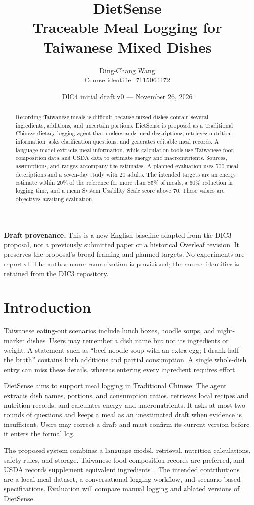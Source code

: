 \documentclass[11pt,a4paper]{article}
\title{DietSense\\Traceable Meal Logging for Taiwanese Mixed Dishes}
\author{Ding-Chang Wang\\Course identifier 7115064172}
\date{DIC4 initial draft v0 --- November 26, 2026}
\begin{document}
\maketitle
\textbf{Draft provenance.} This is a new English baseline adapted from the DIC3 proposal, not a previously submitted paper or a historical Overleaf revision. It preserves the proposal's broad framing and planned targets. No experiments are reported. The author-name romanization is provisional; the course identifier is retained from the DIC3 repository.
\begin{abstract}
Recording Taiwanese meals is difficult because mixed dishes contain several ingredients, additions, and uncertain portions. DietSense is proposed as a Traditional Chinese dietary logging agent that understands meal descriptions, retrieves nutrition information, asks clarification questions, and generates editable meal records. A language model extracts meal information, while calculation tools use Taiwanese food composition data and USDA data to estimate energy and macronutrients. Sources, assumptions, and ranges accompany the estimates. A planned evaluation uses 500 meal descriptions and a seven-day study with 20 adults. The intended targets are an energy estimate within 20\% of the reference for more than 85\% of meals, a 60\% reduction in logging time, and a mean System Usability Scale score above 70. These values are objectives awaiting evaluation.
\end{abstract}
\section{Introduction}
Taiwanese eating-out scenarios include lunch boxes, noodle soups, and night-market dishes. Users may remember a dish name but not its ingredients or weight. A statement such as ``beef noodle soup with an extra egg; I drank half the broth'' contains both additions and partial consumption. A single whole-dish entry can miss these details, whereas entering every ingredient requires effort.

DietSense aims to support meal logging in Traditional Chinese. The agent extracts dish names, portions, and consumption ratios, retrieves local recipes and nutrition records, and calculates energy and macronutrients. It asks at most two rounds of questions and keeps a meal as an unestimated draft when evidence is insufficient. Users may correct a draft and must confirm its current version before it enters the formal log.

The proposed system combines a language model, retrieval, nutrition calculations, safety rules, and storage. Taiwanese food composition records are preferred, and USDA records supplement equivalent ingredients~\cite{tfda,usda}. The intended contributions are a local meal dataset, a conversational logging workflow, and scenario-based specifications. Evaluation will compare manual logging and ablated versions of DietSense.
\end{document}
